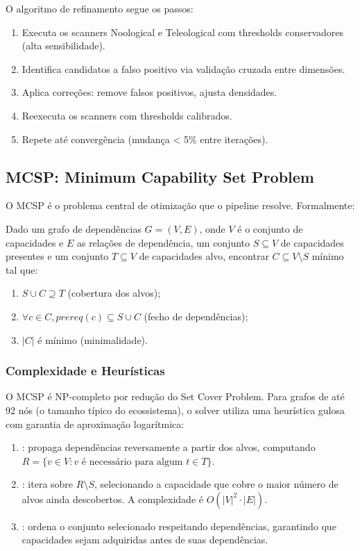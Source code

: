 O algoritmo de refinamento segue os passos:

\begin{enumerate}
\item Executa os scanners Noological e Teleological com thresholds
conservadores (alta sensibilidade).
\item Identifica candidatos a falso positivo via validação cruzada entre
dimensões.
\item Aplica correções: remove falsos positivos, ajusta densidades.
\item Reexecuta os scanners com thresholds calibrados.
\item Repete até convergência (mudança < 5\% entre iterações).
\end{enumerate}

\subsection{MCSP: Minimum Capability Set Problem}

O MCSP é o problema central de otimização que o pipeline resolve.
Formalmente:

\begin{definicao}
Dado um grafo de dependências $G = (V, E)$, onde $V$ é o conjunto de
capacidades e $E$ as relações de dependência, um conjunto $S \subseteq V$
de capacidades presentes e um conjunto $T \subseteq V$ de capacidades
alvo, encontrar $C \subseteq V \setminus S$ mínimo tal que:
\begin{enumerate}
\item $S \cup C \supseteq T$ (cobertura dos alvos);
\item $\forall c \in C, prereq(c) \subseteq S \cup C$ (fecho de
dependências);
\item $|C|$ é mínimo (minimalidade).
\end{enumerate}
\end{definicao}

\subsubsection{Complexidade e Heurísticas}

O MCSP é NP-completo por redução do Set Cover Problem. Para grafos
de até 92 nós (o tamanho típico do ecossistema), o solver utiliza uma
heurística gulosa com garantia de aproximação logarítmica:

\begin{enumerate}
\item {}: propaga dependências reversamente a
partir dos alvos, computando $R = \{v \in V : v \text{ é necessário para
algum } t \in T\}$.
\item {}: itera sobre $R \setminus S$, selecionando
a capacidade que cobre o maior número de alvos ainda descobertos. A
complexidade é $O(|V|^2 \cdot |E|)$.
\item {}: ordena o conjunto selecionado
respeitando dependências, garantindo que capacidades sejam adquiridas antes
de suas dependências.
\end{enumerate}

